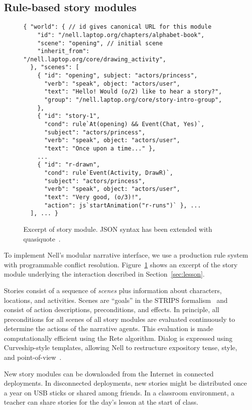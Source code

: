 \documentclass{sig-alternate}
\begin{document}
\subsection{Rule-based story modules}
\begin{figure}\small
\begin{verbatim}
{ "world": { // id gives canonical URL for this module
    "id": "/nell.laptop.org/chapters/alphabet-book",
    "scene": "opening", // initial scene
    "inherit_from": "/nell.laptop.org/core/drawing_activity",
  }, "scenes": [
    { "id": "opening", subject: "actors/princess",
      "verb": "speak", object: "actors/user",
      "text": "Hello! Would (o/2) like to hear a story?",
      "group": "/nell.laptop.org/core/story-intro-group",
    },
    { "id": "story-1",
      "cond": rule`At(opening) && Event(Chat, Yes)`,
      "subject": "actors/princess",
      "verb": "speak", object: "actors/user",
      "text": "Once upon a time..." },
    ...
    { "id": "r-drawn",
      "cond": rule`Event(Activity, DrawR)`,
      "subject": "actors/princess",
      "verb": "speak", object: "actors/user",
      "text": "Very good, (o/3)!",
      "action": js`startAnimation("r-runs")` }, ...
  ], ... }
\end{verbatim}
\caption{Excerpt of story module.  JSON syntax has been extended with
quasiquote~\cite{quasiquote}.}\label{fig:rules}
\end{figure}
To implement Nell's modular narrative interface, we use a
production rule system with programmable conflict resolution.
Figure~\ref{fig:rules} shows
an excerpt of the story module underlying the interaction described in
Section~\ref{sec:lesson}.

Stories consist of a sequence of \textit{scenes} plus information about
characters, locations, and activities.  Scenes are ``goals''
in the STRIPS formalism~\cite{strips} and consist of
action descriptions, preconditions, and effects.
In principle, all preconditions for all scenes of all story modules
are evaluated continuously to determine the actions of the narrative
agents.  This evaluation
is made computationally efficient using the Rete
algorithm.  Dialog is expressed using Curveship-style
templates, allowing Nell to restructure
expository tense, style, and point-of-view~\cite{montfort:curveship}.


New story modules can be downloaded from the Internet in
connected deployments.  In disconnected deployments, new stories
might be distributed once a year on USB sticks or shared among
friends.  In a classroom environment, a teacher can share stories for
the day's lesson at the start of class.
\end{document}
